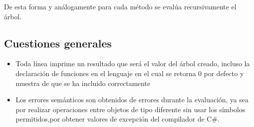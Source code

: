 \documentclass[a4paper,12pt]{article}
\begin{document}
De esta forma y an\'alogamente para cada m\'etodo se eval\'ua recursivamente el \'arbol.

\subsection*{Cuestiones generales}

\begin{itemize}
    \item Toda l\'inea imprime un resultado que ser\'a el valor del \'arbol creado, incluso la declaraci\'on de funciones en el lenguaje en el cual se retorna 0 por defecto y muestra de que se ha incluido correctamente
    \item Los errores sem\'anticos son obtenidos de errores durante la evaluaci\'on, ya sea por realizar operaciones entre objetos de tipo diferente sin usar los s\'imbolos permitidos,por obtener valores de excepci\'on del compilador de C\#.
\end{itemize}


 
\end{document}
